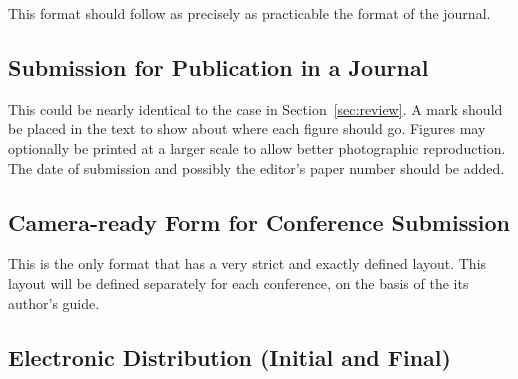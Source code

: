 \documentclass[%
	final,
	notitlepage,
	narroweqnarray,
	inline,
	twoside,
	]{ieee}
\begin{document}
This format should follow as precisely as practicable the format of the 
journal.

\subsection{Submission for Publication in a Journal}

This could be nearly identical to the case in
Section~\ref{sec:review}.  A mark should be placed in the text to show
about where each figure should go.  Figures may optionally be printed
at a larger scale to allow better photographic reproduction.  The date
of submission and possibly the editor's paper number should be added.

\subsection{Camera-ready Form for Conference Submission}

This is the only format that has a very strict and exactly defined
layout.  This layout will be defined separately for each conference,
on the basis of the its author's guide.

\subsection{Electronic Distribution (Initial and Final)}
\end{document}

